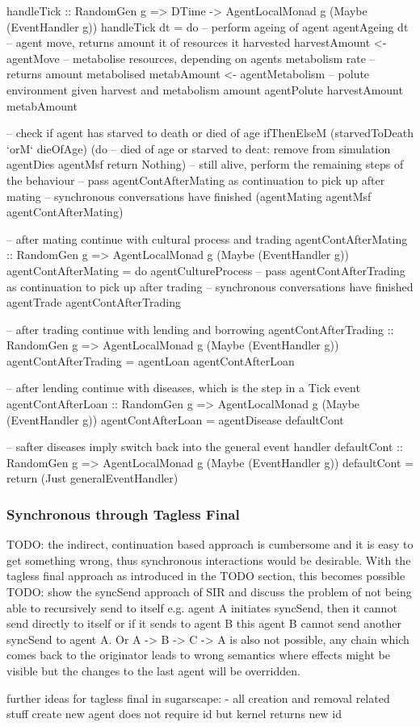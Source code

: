 \begin{HaskellCode}
handleTick :: RandomGen g => DTime -> AgentLocalMonad g (Maybe (EventHandler g))
handleTick dt = do
  -- perform ageing of agent
  agentAgeing dt
  -- agent move, returns amount it of resources it harvested
  harvestAmount <- agentMove
  -- metabolise resources, depending on agents metabolism rate
  -- returns amount metabolised
  metabAmount <- agentMetabolism
  -- polute environment given harvest and metabolism amount
  agentPolute harvestAmount metabAmount

  -- check if agent has starved to death or died of age
  ifThenElseM
    (starvedToDeath `orM` dieOfAge)
    (do
      -- died of age or starved to deat: remove from simulation
      agentDies agentMsf
      return Nothing) 
    -- still alive, perform the remaining steps of the behaviour
    -- pass agentContAfterMating as continuation to pick up after mating
    -- synchronous conversations have finished
    (agentMating agentMsf agentContAfterMating)

-- after mating continue with cultural process and trading
agentContAfterMating :: RandomGen g => AgentLocalMonad g (Maybe (EventHandler g))
agentContAfterMating = do
    agentCultureProcess
    -- pass agentContAfterTrading as continuation to pick up after trading 
    -- synchronous conversations have finished
    agentTrade agentContAfterTrading 

-- after trading continue with lending and borrowing
agentContAfterTrading :: RandomGen g  => AgentLocalMonad g (Maybe (EventHandler g))
agentContAfterTrading = agentLoan agentContAfterLoan

-- after lending continue with diseases, which is the step in a Tick event
agentContAfterLoan :: RandomGen g => AgentLocalMonad g (Maybe (EventHandler g))
agentContAfterLoan = agentDisease defaultCont

-- safter diseases imply switch back into the general event handler
defaultCont :: RandomGen g => AgentLocalMonad g (Maybe (EventHandler g))
defaultCont = return (Just generalEventHandler)
\end{HaskellCode}

\subsubsection{Synchronous through Tagless Final}
TODO: the indirect, continuation based approach is cumbersome and it is easy to get something wrong, thus synchronous interactions would be desirable. With the tagless final approach as introduced in the TODO section, this becomes possible
TODO: show the syncSend approach of SIR and discuss the problem of not being able to recursively send to itself e.g. agent A initiates syncSend, then it cannot send directly to itself or if it sends to agent B this agent B cannot send another syncSend to agent A. Or A -> B -> C -> A is also not possible, any chain which comes back to the originator leads to wrong semantics where effects might be visible but the changes to the last agent will be overridden.

further ideas for tagless final in sugarscape:
- all creation and removal related stuff create new agent does not require id but kernel returns new id